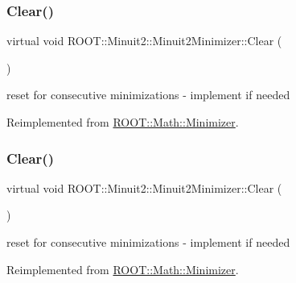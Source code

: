 \subsubsection{\texorpdfstring{Clear()}{Clear()}\hspace{0.1cm}{\footnotesize\ttfamily [2/3]}}
{\footnotesize\ttfamily virtual void R\+O\+O\+T\+::\+Minuit2\+::\+Minuit2\+Minimizer\+::\+Clear (\begin{DoxyParamCaption}{ }\end{DoxyParamCaption})\hspace{0.3cm}{\ttfamily [virtual]}}



reset for consecutive minimizations -\/ implement if needed 



Reimplemented from \mbox{\hyperlink{classROOT_1_1Math_1_1Minimizer_ad7308846baecf68fb0dbc2d5e4caa178}{R\+O\+O\+T\+::\+Math\+::\+Minimizer}}.

\mbox{\label{classROOT_1_1Minuit2_1_1Minuit2Minimizer_a11e6ce9a4285080548f9855b78ca83b4}} 
\subsubsection{\texorpdfstring{Clear()}{Clear()}\hspace{0.1cm}{\footnotesize\ttfamily [3/3]}}
{\footnotesize\ttfamily virtual void R\+O\+O\+T\+::\+Minuit2\+::\+Minuit2\+Minimizer\+::\+Clear (\begin{DoxyParamCaption}{ }\end{DoxyParamCaption})\hspace{0.3cm}{\ttfamily [virtual]}}



reset for consecutive minimizations -\/ implement if needed 



Reimplemented from \mbox{\hyperlink{classROOT_1_1Math_1_1Minimizer_ad7308846baecf68fb0dbc2d5e4caa178}{R\+O\+O\+T\+::\+Math\+::\+Minimizer}}.

\mbox{\label{classROOT_1_1Minuit2_1_1Minuit2Minimizer_a026780c27dd4b179817f826f49e36c8e}} 
